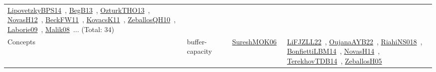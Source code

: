 {\begin{longtable}{lp{3cm}>{\raggedright\arraybackslash}p{6cm}>{\raggedright\arraybackslash}p{6cm}>{\raggedright\arraybackslash}p{8cm}}
\href{../works/LipovetzkyBPS14.pdf}{LipovetzkyBPS14}~\cite{LipovetzkyBPS14}, \href{../works/BegB13.pdf}{BegB13}~\cite{BegB13}, \href{../works/OzturkTHO13.pdf}{OzturkTHO13}~\cite{OzturkTHO13}, \href{../works/NovasH12.pdf}{NovasH12}~\cite{NovasH12}, \href{../works/BeckFW11.pdf}{BeckFW11}~\cite{BeckFW11}, \href{../works/KovacsK11.pdf}{KovacsK11}~\cite{KovacsK11}, \href{../works/ZeballosQH10.pdf}{ZeballosQH10}~\cite{ZeballosQH10}, \href{../works/Laborie09.pdf}{Laborie09}~\cite{Laborie09}, \href{../works/Malik08.pdf}{Malik08}~\cite{Malik08}... (Total: 34)\\
Concepts & buffer-capacity &  & \href{../works/SureshMOK06.pdf}{SureshMOK06}~\cite{SureshMOK06} & \href{../works/LiFJZLL22.pdf}{LiFJZLL22}~\cite{LiFJZLL22}, \href{../works/OujanaAYB22.pdf}{OujanaAYB22}~\cite{OujanaAYB22}, \href{../works/RiahiNS018.pdf}{RiahiNS018}~\cite{RiahiNS018}, \href{../works/BonfiettiLBM14.pdf}{BonfiettiLBM14}~\cite{BonfiettiLBM14}, \href{../works/NovasH14.pdf}{NovasH14}~\cite{NovasH14}, \href{../works/TerekhovTDB14.pdf}{TerekhovTDB14}~\cite{TerekhovTDB14}, \href{../works/ZeballosH05.pdf}{ZeballosH05}~\cite{ZeballosH05}\\

\end{longtable}}
